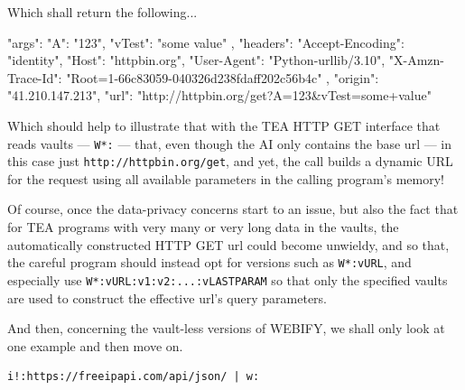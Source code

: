 \documentclass[a4paper, 18pt]{book} %
\begin{document}
{{{\vspace{1em}


Which shall return the following...


  
 \vspace{2em}
 \begin{tcbverbatim}[title=Sample OUTPUT 9 from EXAMPLE 9]
{
  "args": {
    "A": "123",
    "vTest": "some value"
  },
  "headers": {
    "Accept-Encoding": "identity",
    "Host": "httpbin.org",
    "User-Agent": "Python-urllib/3.10",
    "X-Amzn-Trace-Id": "Root=1-66c83059-040326d238fdaff202c56b4c"
  },
  "origin": "41.210.147.213",
  "url": "http://httpbin.org/get?A=123&vTest=some+value"
}
  \end{tcbverbatim}
 \vspace{2em} 
 
Which should help to illustrate that with the TEA HTTP GET interface that reads vaults --- \texttt{W*:} --- that, even though the AI only contains the base url --- in this case just \texttt{http://httpbin.org/get}, and yet, the call builds a dynamic URL for the request using all available parameters in the calling program's memory!

\vspace{2em}

Of course, once the data-privacy concerns start to an issue, but also the fact that for TEA programs with very many or very long data in the vaults, the automatically constructed HTTP GET url could become unwieldy, and so that, the careful program should instead opt for versions such as \texttt{W*:vURL}, and especially use \texttt{W*:vURL:v1:v2:...:vLASTPARAM} so that only the specified vaults are used to construct the effective url's query parameters.

\vspace{2em}

And then, concerning the vault-less versions of WEBIFY, we shall only look at one example and then move on.


\vspace{2em}

  \begin{tcolorbox}[teaterminalstyle, title=W: EXAMPLE 10: A Simple HTTP GET - vault-less calls, breakable]
  \begin{lstlisting}[language=TEA,breaklines=true,]
i!:https://freeipapi.com/api/json/ | w:
   \end{lstlisting}
  \end{tcolorbox}

}}}
\end{document}

